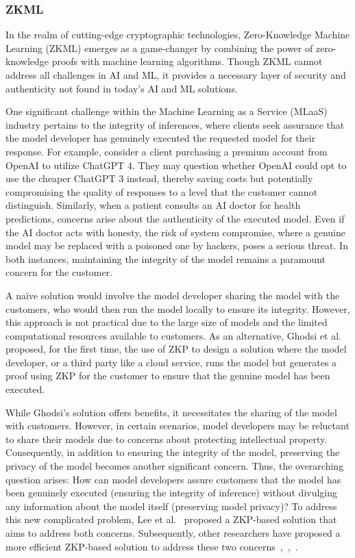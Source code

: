 \documentclass[conference]{IEEEtran}
\begin{document}
\subsubsection{ZKML}

In the realm of cutting-edge cryptographic technologies, Zero-Knowledge Machine Learning (ZKML) emerges as a game-changer by combining the power of zero-knowledge proofs with machine learning algorithms. Though ZKML cannot address all challenges in AI and ML, it provides a necessary layer of security and authenticity not found in today's AI and ML solutions.

One significant challenge within the Machine Learning as a Service (MLaaS) industry pertains to the integrity of inferences, where clients seek assurance that the model developer has genuinely executed the requested model for their response. For example, consider a client purchasing a premium account from OpenAI to utilize ChatGPT 4. They may question whether OpenAI could opt to use the cheaper ChatGPT 3 instead, thereby saving costs but potentially compromising the quality of responses to a level that the customer cannot distinguish. Similarly, when a patient consults an AI doctor for health predictions, concerns arise about the authenticity of the executed model. Even if the AI doctor acts with honesty, the risk of system compromise, where a genuine model may be replaced with a poisoned one by hackers, poses a serious threat. In both instances, maintaining the integrity of the model remains a paramount concern for the customer.

A naïve solution would involve the model developer sharing the model with the customers, who would then run the model locally to ensure its integrity. However, this approach is not practical due to the large size of models and the limited computational resources available to customers. As an alternative, Ghodsi et al.~\cite{Ghodsi2017SafetyNetsVE} proposed, for the first time, the use of ZKP to design a solution where the model developer, or a third party like a cloud service, runs the model but generates a proof using ZKP for the customer to ensure that the genuine model has been executed.

While Ghodsi's solution offers benefits, it necessitates the sharing of the model with customers. However, in certain scenarios, model developers may be reluctant to share their models due to concerns about protecting intellectual property. Consequently, in addition to ensuring the integrity of the model, preserving the privacy of the model becomes another significant concern. Thus, the overarching question arises: How can model developers assure customers that the model has been genuinely executed (ensuring the integrity of inference) without divulging any information about the model itself (preserving model privacy)? To address this new complicated problem, Lee et al.~\cite{Lee2020vCNNVC} proposed a ZKP-based solution that aims to address both concerns. Subsequently, other researchers have proposed a more efficient ZKP-based solution to address these two concerns~\cite{Liu2021zkCNNZK},~\cite{Feng2021ZENAO},~\cite{Ju2021EfficientSP}.
\end{document}
